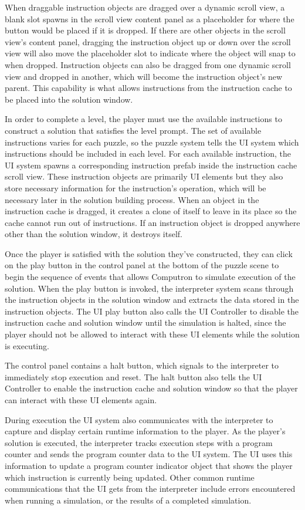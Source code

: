 When draggable instruction objects are dragged over a dynamic scroll view, a blank slot spawns in the scroll view content panel as a placeholder for where the button would be placed if it is dropped. If there are other objects in the scroll view's content panel, dragging the instruction object up or down over the scroll view will also move the placeholder slot to indicate where the object will snap to when dropped.
Instruction objects can also be dragged from one dynamic scroll view and dropped in another, which will become the instruction object's new parent. This capability is what allows instructions from the instruction cache to be placed into the solution window.


In order to complete a level, the player must use the available instructions to construct a solution that satisfies the level prompt. The set of available instructions varies for each puzzle, so the puzzle system tells the UI system which instructions should be included in each level.  For each available instruction, the UI system spawns a corresponding instruction prefab inside the instruction cache scroll view. These instruction objects are primarily UI elements but they also store necessary information for the instruction's operation, which will be necessary later in the solution building process.
When an object in the instruction cache is dragged, it creates a clone of itself to leave in its place so the cache cannot run out of instructions. If an instruction object is dropped anywhere other than the solution window, it destroys itself.

Once the player is satisfied with the solution they've constructed, they can click on the play button in the control panel at the bottom of the puzzle scene to begin the sequence of events that allows Computron to simulate execution of the solution. When the play button is invoked, the interpreter system scans through the instruction objects in the solution window and extracts the data stored in the instruction objects.
The UI play button also calls the UI Controller to disable the instruction cache and solution window until the simulation is halted, since the player should not be allowed to interact with these UI elements while the solution is executing.


The control panel contains a halt button, which signals to the interpreter to immediately stop execution and reset. The halt button also tells the UI Controller to enable the instruction cache and solution window so that the player can interact with these UI elements again.


During execution the UI system also communicates with the interpreter to capture and display certain runtime information to the player.
As the player's solution is executed, the interpreter tracks execution steps with a program counter and sends the program counter data to the UI system. The UI uses this information to update a program counter indicator object that shows the player which instruction is currently being updated. Other common runtime communications that the UI gets from the interpreter include errors encountered when running a simulation, or the results of a completed simulation.


